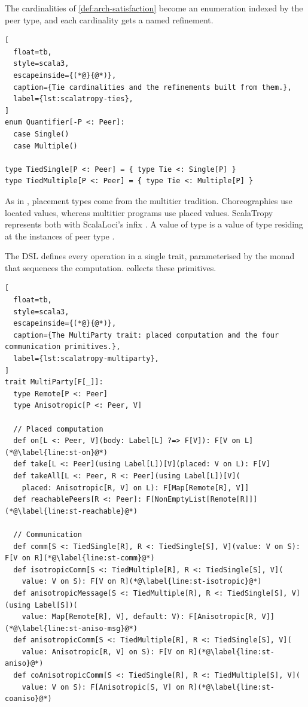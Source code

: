 The cardinalities of \cref{def:arch-satisfaction} become an enumeration indexed by the peer type,
and each cardinality gets a named refinement.

\begin{lstlisting}[
  float=tb,
  style=scala3,
  escapeinside={(*@}{@*)},
  caption={Tie cardinalities and the refinements built from them.},
  label={lst:scalatropy-ties},
]
enum Quantifier[-P <: Peer]:
  case Single()
  case Multiple()

type TiedSingle[P <: Peer] = { type Tie <: Single[P] }
type TiedMultiple[P <: Peer] = { type Tie <: Multiple[P] }
\end{lstlisting}

As in \camil, placement types come from the multitier tradition.
Choreographies use located values, whereas multitier programs use placed values.
ScalaTropy represents both with ScalaLoci's infix \;\;.
%
A value of type \;\; is a value of type  residing at the instances of peer type .

The DSL defines every operation in a single trait, parameterised by the monad  that sequences the computation.
%
 collects these primitives.

\begin{lstlisting}[
  float=tb,
  style=scala3,
  escapeinside={(*@}{@*)},
  caption={The MultiParty trait: placed computation and the four communication primitives.},
  label={lst:scalatropy-multiparty},
]
trait MultiParty[F[_]]:
  type Remote[P <: Peer]
  type Anisotropic[P <: Peer, V]

  // Placed computation
  def on[L <: Peer, V](body: Label[L] ?=> F[V]): F[V on L](*@\label{line:st-on}@*)
  def take[L <: Peer](using Label[L])[V](placed: V on L): F[V]
  def takeAll[L <: Peer, R <: Peer](using Label[L])[V](
    placed: Anisotropic[R, V] on L): F[Map[Remote[R], V]]
  def reachablePeers[R <: Peer]: F[NonEmptyList[Remote[R]]](*@\label{line:st-reachable}@*)

  // Communication
  def comm[S <: TiedSingle[R], R <: TiedSingle[S], V](value: V on S): F[V on R](*@\label{line:st-comm}@*)
  def isotropicComm[S <: TiedMultiple[R], R <: TiedSingle[S], V](
    value: V on S): F[V on R](*@\label{line:st-isotropic}@*)
  def anisotropicMessage[S <: TiedMultiple[R], R <: TiedSingle[S], V](using Label[S])(
    value: Map[Remote[R], V], default: V): F[Anisotropic[R, V]](*@\label{line:st-aniso-msg}@*)
  def anisotropicComm[S <: TiedMultiple[R], R <: TiedSingle[S], V](
    value: Anisotropic[R, V] on S): F[V on R](*@\label{line:st-aniso}@*)
  def coAnisotropicComm[S <: TiedSingle[R], R <: TiedMultiple[S], V](
    value: V on S): F[Anisotropic[S, V] on R](*@\label{line:st-coaniso}@*)
\end{lstlisting}

